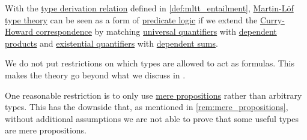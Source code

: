 \begin{remark}\label{rem:mltt_hol}
  With the \hyperref[def:type_derivation_relation]{type derivation relation} defined in \cref{def:mltt_entailment}, \hyperref[def:mltt]{Martin-L\"of type theory} can be seen as a form of \hyperref[rem:predicate_logic]{predicate logic} if we extend the \hyperref[con:curry_howard_correspondence]{Curry-Howard correspondence} by matching \hyperref[def:higher_order_language/quantifiers/universal]{universal quantifiers} with \hyperref[def:dependent_product]{dependent products} and \hyperref[def:higher_order_language/quantifiers/existential]{existential quantifiers} with \hyperref[def:dependent_sum]{dependent sums}.

  We do not put restrictions on which types are allowed to act as formulas. This makes the theory go beyond what we discuss in .

  One reasonable restriction is to only use \hyperref[def:mere_proposition]{mere propositions} rather than arbitrary types. This has the downside that, as mentioned in \cref{rem:mere_propositions}, without additional assumptions we are not able to prove that some useful types are mere propositions.
\end{remark}

